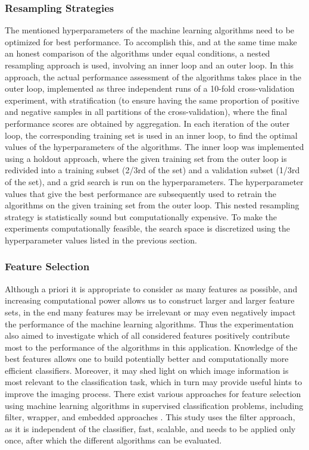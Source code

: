 \subsubsection{Resampling Strategies}
\label{subsubsec:resampling}
The mentioned hyperparameters of the machine learning algorithms need to be optimized for best performance. To accomplish this, and at the same time make an honest comparison of the algorithms under equal conditions, a nested resampling approach \cite{simon2007resampling, bischl2012resampling} is used, involving an inner loop and an outer loop. In this approach, the actual performance assessment of the algorithms takes place in the outer loop, implemented as three independent runs of a 10-fold cross-validation experiment, with stratification (to ensure having the same proportion of positive and negative samples in all partitions of the cross-validation), where the final performance scores are obtained by aggregation. In each iteration of the outer loop, the corresponding training set is used in an inner loop, to find the optimal values of the hyperparameters of the algorithms. The inner loop was implemented using a holdout approach, where the given training set from the outer loop is redivided into a training subset (2/3rd of the set) and a validation subset (1/3rd of the set), and a grid search is run on the hyperparameters. The hyperparameter values that give the best performance are subsequently used to retrain the algorithms on the given training set from the outer loop. This nested resampling strategy is statistically sound but computationally expensive. To make the experiments computationally feasible, the search space is discretized using the hyperparameter values listed in the previous section.

\subsubsection{Feature Selection}
\label{subsubsec:featureSelection}
Although a priori it is appropriate to consider as many features as possible, and increasing  computational power allows us to construct larger and larger feature sets, in the end many features may be irrelevant or may even negatively impact the performance of the machine learning algorithms. Thus the experimentation also aimed to investigate which of all considered features positively contribute most to the performance of the algorithms in this application. Knowledge of the best features allows one to build potentially better and computationally more efficient classifiers. Moreover, it may shed light on which image information is most relevant to the classification task, which in turn may provide useful hints to improve the imaging process. There exist various approaches for feature selection using machine learning algorithms in supervised classification problems, including filter, wrapper, and embedded approaches \cite{saeys2007review}. This study uses the filter approach, as it is independent of the classifier, fast, scalable, and needs to be applied only once, after which the different algorithms can be evaluated.
